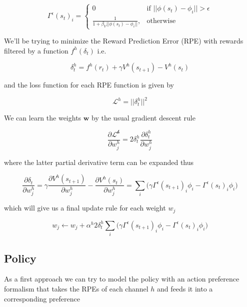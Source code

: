 \documentclass{article}
\begin{document}
\begin{equation}
\Gamma^\epsilon(s_t)_i = 
\begin{cases}
    0 & \text{if } ||\phi(s_t)-\phi_i||>\epsilon\\
     \frac{1}{1+\beta_V ||\phi(s_t)-\phi_i||},         & \text{otherwise}
\end{cases}
\end{equation}

We'll be trying to minimize the Reward Prediction Error (RPE) with rewards filtered by a function $f^h(\delta_t)$ i.e.

\begin{equation}
  \delta^h_t = f^h(r_t) + \gamma V^h(s_{t+1})-V^h(s_t)
\end{equation}

and the loss function for each RPE function is given by

\begin{equation}
  \mathcal{L}^h = ||\delta^h_t||^2
\end{equation}

We can learn the weights $\mathbf{w}$ by the usual gradient descent rule

\begin{equation}
  \frac{\partial \mathcal{L^h}}{\partial w^h_j} = 2 \delta^h_t\frac{\partial \delta^h_t}{\partial w^h_j}
\end{equation}

where the latter partial derivative term can be expanded thus 

\begin{equation}
  \frac{\partial \delta_t}{\partial w^h_j} = \gamma\frac{\partial V^h(s_{t+1})}{\partial w^h_j} - \frac{\partial V^h(s_{t})}{\partial w^h_j} =   \sum_{i} \big ( \gamma \Gamma^\epsilon(s_{t+1})_i \phi_i-\Gamma^\epsilon(s_t)_i\phi_i \big )
\end{equation}

which will give us a final update rule for each weight $w_j$ 

\begin{equation}
  w_j \leftarrow w_j + \alpha^h 2 \delta^h_t\sum_{i} \big ( \gamma \Gamma^\epsilon(s_{t+1})_i \phi_i-\Gamma^\epsilon(s_t)_i\phi_i \big )
\end{equation}

\subsection{Policy}

As a first approach we can try to model the policy with an action preference formalism that takes the RPEs of each channel $h$
and feeds it into a corresponding preference 
\end{document}

